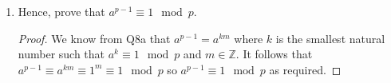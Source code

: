 \documentclass[letterpaper,12pt]{article}
\begin{document}
\begin{enumerate}
\begin{enumerate}
\begin{proof}
        \end{proof}
        \item Hence, prove that $a^{p-1} \equiv 1 \mod p$. \begin{proof}
            We know from Q8a that $a^{p-1} = a^{km}$ where $k$ is the smallest natural number such that $a^k \equiv 1 \mod p$ and $m \in \mathbb{Z}$. It follows that $a^{p-1}\equiv a^{km} \equiv 1^m \equiv 1 \mod p$ so $a^{p-1} \equiv 1 \mod p$ as required.
        \end{proof}
    \end{enumerate}
\end{enumerate}
\end{document}
